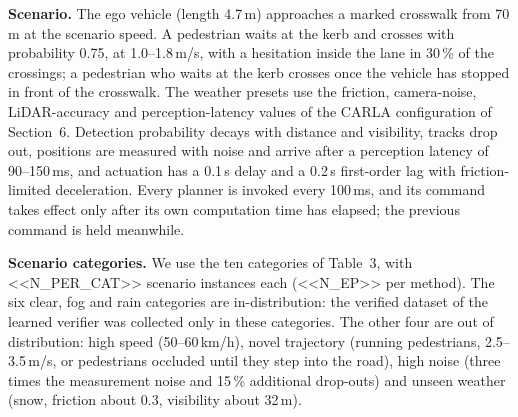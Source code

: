\documentclass[11pt]{article}
\begin{document}
\textbf{Scenario.} The ego vehicle (length 4.7\,m) approaches a marked crosswalk from 70\,m at the scenario speed. A pedestrian waits at
the kerb and crosses with probability 0.75, at 1.0--1.8\,m/s, with a hesitation inside the lane in 30\,\% of the crossings; a
pedestrian who waits at the kerb crosses once the vehicle has stopped in front of the crosswalk. The weather presets use the friction,
camera-noise, LiDAR-accuracy and perception-latency values of the CARLA configuration of Section~6. Detection probability decays with
distance and visibility, tracks drop out, positions are measured with noise and arrive after a perception latency of 90--150\,ms, and
actuation has a 0.1\,s delay and a 0.2\,s first-order lag with friction-limited deceleration. Every planner is invoked every 100\,ms,
and its command takes effect only after its own computation time has elapsed; the previous command is held meanwhile.

\textbf{Scenario categories.} We use the ten categories of Table~3, with <<N_PER_CAT>> scenario instances each (<<N_EP>> per method). The six
clear, fog and rain categories are in-distribution: the verified dataset of the learned verifier was collected only in these
categories. The other four are out of distribution: high speed (50--60\,km/h), novel trajectory (running pedestrians, 2.5--3.5\,m/s, or
pedestrians occluded until they step into the road), high noise (three times the measurement noise and 15\,\% additional
drop-outs) and unseen weather (snow, friction about 0.3, visibility about 32\,m).
\end{document}
